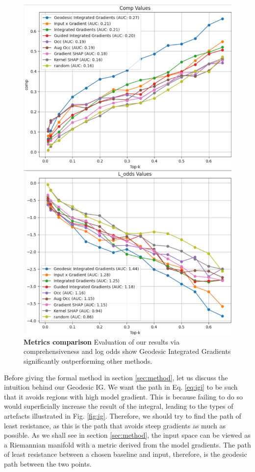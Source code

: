 \begin{figure}[!hbp]
	\vskip 0.2in
	\begin{center}
		\includegraphics[width=0.85\columnwidth]{figures/voc_metrics_vertical.png}
		\caption{\textbf{Metrics comparison} Evaluation of our results via comprehensiveness  \citep{deyoung2019eraser} and log odds \citep{shrikumar2017learning} show Geodesic Integrated Gradients significantly outperforming other methods.}
		\label{fig:voc_metrics}
	\end{center}
	\vskip -0.2in
\end{figure}

Before giving the formal method in section \ref{sec:method}, let us discuss the intuition behind our Geodesic IG. We want the path in Eq. \ref{eq:igi} to be such that it avoids regions with high model gradient. This is because failing to do so would superficially increase the result of the integral, leading to the types of artefacts illustrated in Fig. \ref{fig:ig}. Therefore, we should try to find the path of least resistance, as this is the path that avoids steep gradients as much as possible. As we shall see in section \ref{sec:method}, the input space can be viewed as a Riemannian manifold with a metric derived from the model gradients. The path of least resistance between a chosen baseline and input, therefore, is the geodesic path between the two points.

